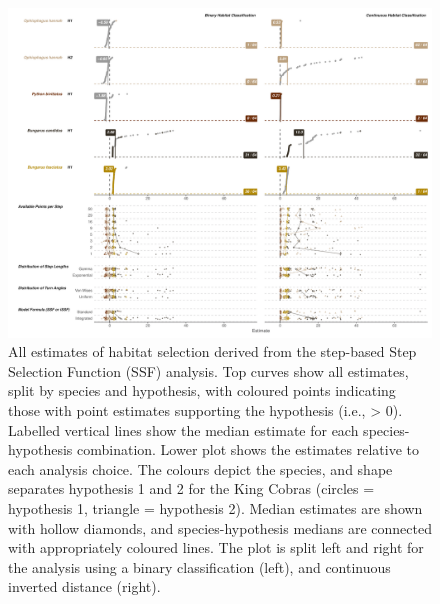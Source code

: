 \documentclass[10pt,a4paper]{article}
\begin{document}
\begin{figure}
\includegraphics[width=1\linewidth]{../../figures/specCurve_ssf} \caption{All estimates of habitat selection derived from the step-based Step Selection Function (SSF) analysis. Top curves show all estimates, split by species and hypothesis, with coloured points indicating those with point estimates supporting the hypothesis (i.e., > 0). Labelled vertical lines show the median estimate for each species-hypothesis combination. Lower plot shows the estimates relative to each analysis choice. The colours depict the species, and shape separates hypothesis 1 and 2 for the King Cobras (circles = hypothesis 1, triangle = hypothesis 2). Median estimates are shown with hollow diamonds, and species-hypothesis medians are connected with appropriately coloured lines. The plot is split left and right for the analysis using a binary classification (left), and continuous inverted distance (right).}\label{fig:specCurveSsf}
\end{figure}
\end{document}

